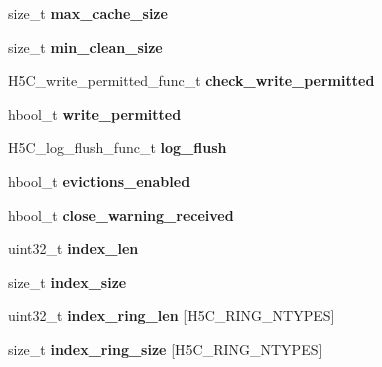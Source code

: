 \begin{DoxyCompactItemize}
\mbox{\label{struct_h5_c__t_a45d84790eae1045b04b283298c360a59}} 
size\+\_\+t {\bfseries max\+\_\+cache\+\_\+size}
\item 
\mbox{\label{struct_h5_c__t_aba41a3d335503cfcc08b5ef2e851666d}} 
size\+\_\+t {\bfseries min\+\_\+clean\+\_\+size}
\item 
\mbox{\label{struct_h5_c__t_af5acf90f51e0017d5707ec48a0cd1c79}} 
H5\+C\+\_\+write\+\_\+permitted\+\_\+func\+\_\+t {\bfseries check\+\_\+write\+\_\+permitted}
\item 
\mbox{\label{struct_h5_c__t_a1527c3f9a28e9767401ab2ad4184e481}} 
hbool\+\_\+t {\bfseries write\+\_\+permitted}
\item 
\mbox{\label{struct_h5_c__t_a3f226b5c36ff5d33f0fc1f9daeb673fd}} 
H5\+C\+\_\+log\+\_\+flush\+\_\+func\+\_\+t {\bfseries log\+\_\+flush}
\item 
\mbox{\label{struct_h5_c__t_ac05c301c749a30e6fb34e8e25f17d5ed}} 
hbool\+\_\+t {\bfseries evictions\+\_\+enabled}
\item 
\mbox{\label{struct_h5_c__t_a8957317982182d82333df84dc9dac75e}} 
hbool\+\_\+t {\bfseries close\+\_\+warning\+\_\+received}
\item 
\mbox{\label{struct_h5_c__t_a834be6f80f6aeef7e9525ab345345849}} 
uint32\+\_\+t {\bfseries index\+\_\+len}
\item 
\mbox{\label{struct_h5_c__t_af264790c16edfbe930df1068039796cc}} 
size\+\_\+t {\bfseries index\+\_\+size}
\item 
\mbox{\label{struct_h5_c__t_a7a5b326b73df482f09737fe69596fd49}} 
uint32\+\_\+t {\bfseries index\+\_\+ring\+\_\+len} \mbox{[}H5\+C\+\_\+\+R\+I\+N\+G\+\_\+\+N\+T\+Y\+P\+ES\mbox{]}
\item 
\mbox{\label{struct_h5_c__t_ae912559aca2313cead22ab6a9e9285b8}} 
size\+\_\+t {\bfseries index\+\_\+ring\+\_\+size} \mbox{[}H5\+C\+\_\+\+R\+I\+N\+G\+\_\+\+N\+T\+Y\+P\+ES\mbox{]}
\item 

\end{DoxyCompactItemize}

